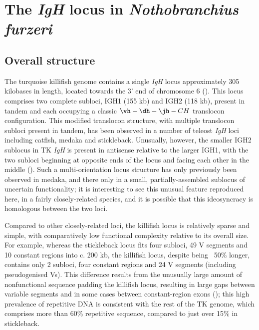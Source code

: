 \section{The \textit{IgH} locus in \textit{Nothobranchius furzeri}}
\label{sec:nfu-locus}


	\subsection{Overall structure}
	\label{sec:nfu-locus-structure}
	
	The turquoise killifish genome contains a single \textit{IgH} locus approximately 305 kilobases in length, located towards the 3' end of chromosome 6 ().
	This locus comprises two complete subloci, IGH1 (155 kb) and IGH2 (118 kb), present in tandem and each occupying a classic ${\vh-\dh-\jh-CH}$ translocon configuration. This modified translocon structure, with multiple translocon subloci present in tandem, has been observed in a number of teleost \textit{IgH} loci including catfish, medaka and stickleback. Unusually, however, the smaller IGH2 sublocus in TK \textit{IgH} is present in antisense relative to the larger IGH1, with the two subloci beginning at opposite ends of the locus and facing each other in the middle (). Such a multi-orientation locus structure has only previously been observed in medaka, and there only in a small, partially-assembled sublocus of uncertain functionality; it is interesting to see this unusual feature reproduced here, in a fairly closely-related species, and it is possible that this ideosyncracy is homologous between the two loci. %
	
	Compared to other closely-related loci, the killifish locus is relatively sparse and simple, with comparatively low functional complexity relative to its overall size. For example, whereas the stickleback locus fits four subloci, 49 V segments and 10 constant regions into c. 200 kb, the killifish locus, despite being ~50\% longer, contains only 2 subloci, four constant regions and 24 V segments (including pseudogenised Vs). This difference results from the unusually large amount of nonfunctional sequence padding the killifish locus, resulting in large gaps between variable segments and in some cases between constant-region exons (); this high prevalence of repetitive DNA is consistent with the rest of the TK genome, which comprises more than 60\% repetitive sequence, compared to just over 15\% in stickleback.
	
